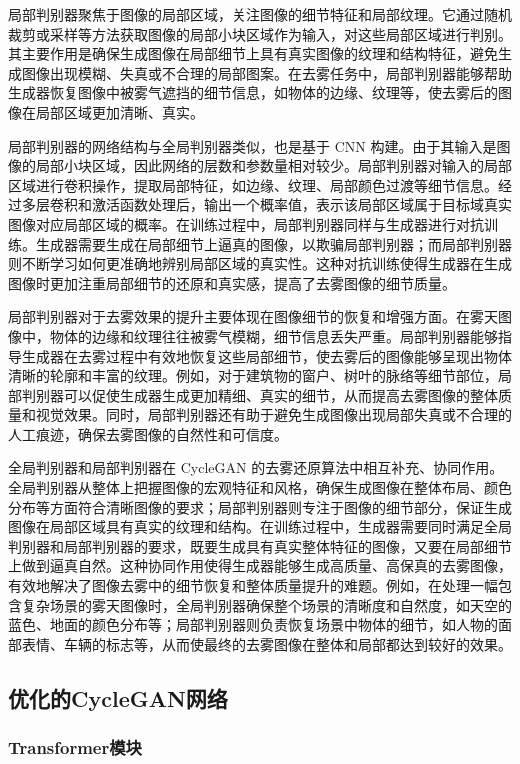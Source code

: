 局部判别器聚焦于图像的局部区域，关注图像的细节特征和局部纹理。它通过随机裁剪或采样等方法获取图像的局部小块区域作为输入，对这些局部区域进行判别。其主要作用是确保生成图像在局部细节上具有真实图像的纹理和结构特征，避免生成图像出现模糊、失真或不合理的局部图案。在去雾任务中，局部判别器能够帮助生成器恢复图像中被雾气遮挡的细节信息，如物体的边缘、纹理等，使去雾后的图像在局部区域更加清晰、真实。

局部判别器的网络结构与全局判别器类似，也是基于 CNN 构建。由于其输入是图像的局部小块区域，因此网络的层数和参数量相对较少。局部判别器对输入的局部区域进行卷积操作，提取局部特征，如边缘、纹理、局部颜色过渡等细节信息。经过多层卷积和激活函数处理后，输出一个概率值，表示该局部区域属于目标域真实图像对应局部区域的概率。在训练过程中，局部判别器同样与生成器进行对抗训练。生成器需要生成在局部细节上逼真的图像，以欺骗局部判别器；而局部判别器则不断学习如何更准确地辨别局部区域的真实性。这种对抗训练使得生成器在生成图像时更加注重局部细节的还原和真实感，提高了去雾图像的细节质量。


局部判别器对于去雾效果的提升主要体现在图像细节的恢复和增强方面。在雾天图像中，物体的边缘和纹理往往被雾气模糊，细节信息丢失严重。局部判别器能够指导生成器在去雾过程中有效地恢复这些局部细节，使去雾后的图像能够呈现出物体清晰的轮廓和丰富的纹理。例如，对于建筑物的窗户、树叶的脉络等细节部位，局部判别器可以促使生成器生成更加精细、真实的细节，从而提高去雾图像的整体质量和视觉效果。同时，局部判别器还有助于避免生成图像出现局部失真或不合理的人工痕迹，确保去雾图像的自然性和可信度。

全局判别器和局部判别器在 CycleGAN 的去雾还原算法中相互补充、协同作用。全局判别器从整体上把握图像的宏观特征和风格，确保生成图像在整体布局、颜色分布等方面符合清晰图像的要求；局部判别器则专注于图像的细节部分，保证生成图像在局部区域具有真实的纹理和结构。在训练过程中，生成器需要同时满足全局判别器和局部判别器的要求，既要生成具有真实整体特征的图像，又要在局部细节上做到逼真自然。这种协同作用使得生成器能够生成高质量、高保真的去雾图像，有效地解决了图像去雾中的细节恢复和整体质量提升的难题。例如，在处理一幅包含复杂场景的雾天图像时，全局判别器确保整个场景的清晰度和自然度，如天空的蓝色、地面的颜色分布等；局部判别器则负责恢复场景中物体的细节，如人物的面部表情、车辆的标志等，从而使最终的去雾图像在整体和局部都达到较好的效果。

\subsection{优化的CycleGAN网络}

\subsubsection{Transformer模块}

